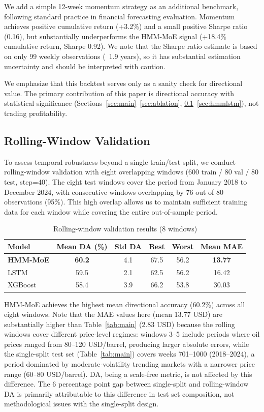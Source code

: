 \documentclass[3p,times]{elsarticle}
\begin{document}
We add a simple 12-week momentum strategy as an additional benchmark, following standard practice in financial forecasting evaluation. Momentum achieves positive cumulative return (+3.2\%) and a small positive Sharpe ratio (0.16), but substantially underperforms the HMM-MoE signal (+18.4\% cumulative return, Sharpe 0.92). We note that the Sharpe ratio estimate is based on only 99 weekly observations (~1.9 years), so it has substantial estimation uncertainty and should be interpreted with caution.

We emphasize that this backtest serves only as a sanity check for directional value. The primary contribution of this paper is directional accuracy with statistical significance (Sections~\ref{sec:main}--\ref{sec:ablation}, \ref{sec:rolling}--\ref{sec:hmmlstm}), not trading profitability.

\subsection{Rolling-Window Validation}
\label{sec:rolling}

To assess temporal robustness beyond a single train/test split, we conduct rolling-window validation with eight overlapping windows (600 train / 80 val / 80 test, step=40). The eight test windows cover the period from January 2018 to December 2024, with consecutive windows overlapping by 76 out of 80 observations (95\%). This high overlap allows us to maintain sufficient training data for each window while covering the entire out-of-sample period.

\begin{table}[htbp]
\centering
\caption{Rolling-window validation results (8 windows)}
\label{tab:rolling}
\begin{tabular}{lccccc}
\toprule
Model & Mean DA (\%) & Std DA & Best & Worst & Mean MAE \\
\midrule
\textbf{HMM-MoE} & \textbf{60.2} & 4.1 & 67.5 & 56.2 & \textbf{13.77} \\
LSTM & 59.5 & 2.1 & 62.5 & 56.2 & 16.42 \\
XGBoost & 58.4 & 3.9 & 66.2 & 53.8 & 30.03 \\
\bottomrule
\end{tabular}
\end{table}

HMM-MoE achieves the highest mean directional accuracy (60.2\%) across all eight windows. Note that the MAE values here (mean 13.77 USD) are substantially higher than Table~\ref{tab:main} (2.83 USD) because the rolling windows cover different price-level regimes: windows 3--5 include periods where oil prices ranged from 80--120 USD/barrel, producing larger absolute errors, while the single-split test set (Table~\ref{tab:main}) covers weeks 701--1000 (2018--2024), a period dominated by moderate-volatility trending markets with a narrower price range (60--80 USD/barrel). DA, being a scale-free metric, is not affected by this difference. The 6 percentage point gap between single-split and rolling-window DA is primarily attributable to this difference in test set composition, not methodological issues with the single-split design.
\end{document}
